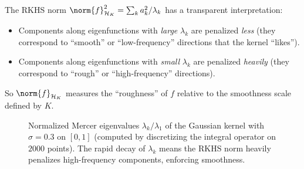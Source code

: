 \begin{notechapter}
\begin{intuition}
The RKHS norm $\norm{f}_{\hk}^2 = \sum_k a_k^2/\lambda_k$ has a
transparent interpretation:
\begin{itemize}
  \item Components along eigenfunctions with \emph{large} $\lambda_k$
  are penalized \emph{less} (they correspond to ``smooth'' or
  ``low-frequency'' directions that the kernel ``likes'').
  \item Components along eigenfunctions with \emph{small} $\lambda_k$
  are penalized \emph{heavily} (they correspond to ``rough'' or
  ``high-frequency'' directions).
\end{itemize}
So $\norm{f}_{\hk}$ measures the ``roughness'' of $f$ relative to the
smoothness scale defined by $K$.
\end{intuition}
%
\begin{figure}[h]
\centering
{}
\caption{Normalized Mercer eigenvalues $\lambda_k/\lambda_1$ of the Gaussian kernel with $\sigma = 0.3$ on $[0,1]$ (computed by discretizing the integral operator on $2000$ points). The
rapid decay of $\lambda_k$ means the RKHS norm heavily penalizes
high-frequency components, enforcing smoothness.}
\label{rkhs:fig:mercer_eigenvalues}
\end{figure}


\end{notechapter}
